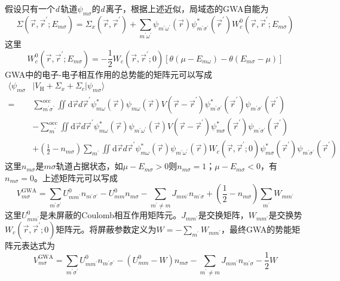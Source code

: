 假设只有一个{\it d}\,轨道$\psi_{m\sigma}$的{\it d}\,离子，根据上述近似，局域态的GWA自能为
\begin{equation}
  \Sigma(\vec r,\vec r^{\prime};E_{m\sigma})=\Sigma_x(\vec r,\vec r^{\prime})+\sum_{m^{\prime}\omega^{\prime}}\psi_{m^{\prime}\omega^{\prime}}(\vec r)\psi_{m^{\prime}\sigma^{\prime}}^{\ast}(\vec r^{\prime})W_c^0(\vec r,\vec r^{\prime};E_{m\sigma})
  \label{eq:solid-245}
\end{equation}
这里$$W_c^0(\vec r,\vec r^{\prime};E_{m\sigma})=-\frac12W_c(\vec r,\vec r^{\prime};0)[\theta(\mu-E_{m\omega})-\theta(E_{m\sigma}-\mu)]$$
GWA中的电子-电子相互作用的总势能的矩阵元可以写成
\begin{equation}
  \begin{split}
	  \langle\psi_{m\sigma}&|V_{\mathrm{H}}+\Sigma_x+\Sigma_c|\psi_{m\sigma}\rangle\\
	  =&\sum_{m^{\prime}\sigma^{\prime}}^{\mathrm{occ}}\iint\mathrm{d}\vec rd\vec r^{\prime}\psi_{m\omega}^{\ast}(\vec r)\psi_{m\omega}(\vec r)V(\vec r-\vec r^{\prime})\psi_{m^{\prime}\sigma^{\prime}}^{\ast}(\vec r^{\prime})\psi_{m^{\prime}\sigma^{\prime}}(\vec r^{\prime})\\
	  &-\sum_{m^{\prime}}^{\mathrm{occ}}\iint\mathrm{d}\vec rd\vec r^{\prime}\psi_{m\omega}^{\ast}(\vec r)\psi_{m^{\prime}\omega^{\prime}}(\vec r)V(\vec r-\vec r^{\prime})\psi_{m\sigma}^{\ast}(\vec r^{\prime})\psi_{m^{\prime}\sigma^{\prime}}(\vec r^{\prime})\\
    &+\left(\frac12-n_{m\sigma}\right)\sum_{m^{\prime}}\iint\mathrm{d}\vec rd\vec r^{\prime}\psi_{m\omega}^{\ast}(\vec r)\psi_{m^{\prime}\omega^{\prime}}(\vec r)W_c(\vec r,\vec r^{\prime};0)\psi_{m\sigma}^{\ast}(\vec r^{\prime})\psi_{m^{\prime}\sigma^{\prime}}(\vec r^{\prime})
  \end{split}
  \label{eq:solid-246}
\end{equation}
这里$n_{m\sigma}$是$m\sigma$轨道占据状态，如$\mu-E_{m\sigma}>0$则$n_{m\sigma}=1$；$\mu-E_{m\sigma}<0$，有$n_{m\sigma}=0$。上述矩阵元可以写成
$$V_{m\sigma}^{\mathrm{GWA}}=\sum_{m^{\prime}\sigma^{\prime}}U_{mm^{\prime}}^0n_{m^{\prime}\sigma^{\prime}}-U_{mm}^0n_{m\sigma}-\sum_{m^{\prime}\neq m}J_{mm^{\prime}}n_{m^{\prime}\sigma}+\left(\frac12-n_{m\sigma}\right)\sum_{m^{\prime}}W_{mm^{\prime}}$$
这里$U_{mm^{\prime}}^0$是未屏蔽的Coulomb相互作用矩阵元。$J_{mm^{\prime}}$是交换矩阵，$W_{mm^{\prime}}$是交换势$W_c(\vec r,\vec r^{\prime};0)$矩阵元。将屏蔽参数定义为$W=-\sum\limits_{m^{\prime}}W_{mm^{\prime}}$，最终GWA的势能矩阵元表达式为\cite{JPCM9-767_1997}
\begin{equation}
	V_{m\sigma}^{\mathrm{GWA}}=\sum_{m^{\prime}\sigma^{\prime}}U_{mm^{\prime}}^0n_{m^{\prime}\sigma^{\prime}}-(U_{mm}^0-W)n_{m\sigma}-\sum_{m^{\prime}\neq m}J_{mm^{\prime}}n_{m^{\prime}\sigma}-\frac12W
  \label{eq:solid-247}
\end{equation}
